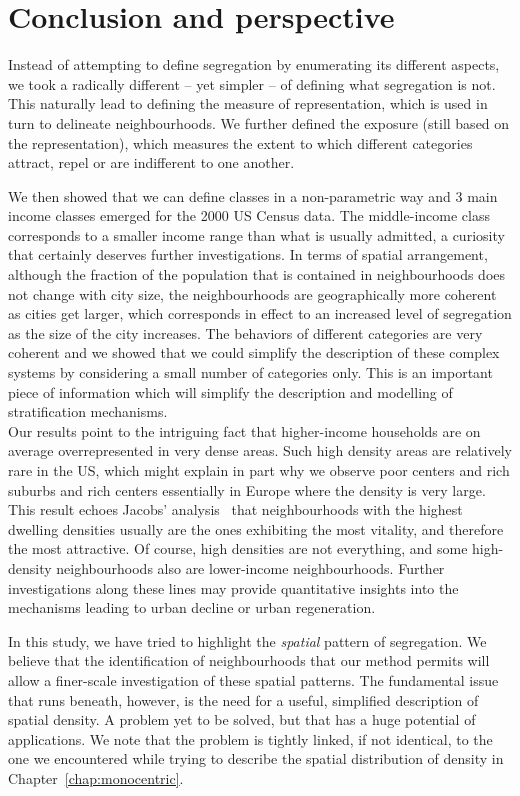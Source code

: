 \section{Conclusion and perspective}
\label{sec:conclusion_and_perspective}

Instead of attempting to define segregation by enumerating its different aspects, we took
a radically different -- yet simpler -- of defining what segregation is not.
This naturally lead to defining the measure of representation, which is used in
turn to delineate neighbourhoods. We further defined the exposure (still based
on the representation), which measures the extent to which different categories
attract, repel or are indifferent to one another.

We then showed that we can define classes in a non-parametric way and 3 main
income classes emerged for the 2000 US Census data. The middle-income class
corresponds to a smaller income range than what is usually admitted, a curiosity
that certainly deserves further investigations. In terms of spatial arrangement,
although the fraction of the population that is contained in neighbourhoods does
not change with city size, the neighbourhoods are geographically more coherent
as cities get larger, which corresponds in effect to an increased level of
segregation as the size of the city increases. The behaviors of different
categories are very coherent and we showed that we could simplify the
description of these complex systems by considering a small number of categories
only. This is an important piece of information which will simplify the
description and modelling of stratification mechanisms.\\

Our results point to the intriguing fact that higher-income households are on
average overrepresented in very dense areas. Such high density areas are
relatively rare in the US, which might explain in part why we observe poor
centers and rich suburbs and rich centers essentially in Europe where the
density is very large. This result echoes Jacobs' analysis~\cite{Jacobs:1961}
that neighbourhoods with the highest dwelling densities usually are the ones
exhibiting the most vitality, and therefore the most attractive. Of course, high
densities are not everything, and some high-density neighbourhoods also are
lower-income neighbourhoods. Further investigations along these lines may
provide quantitative insights into the mechanisms leading to urban decline or
urban regeneration. 

In this study, we have tried to highlight the \emph{spatial} pattern of
segregation.  We believe that the identification of neighbourhoods that our
method permits will allow a finer-scale investigation of these spatial patterns.
The fundamental issue that runs beneath, however,  is the need for a useful, simplified
description of spatial density. A problem yet to be solved, but
that has a huge potential of applications. We note that the problem is tightly
linked, if not identical, to the one we encountered while trying to describe the
spatial distribution of density in Chapter~\ref{chap:monocentric}.



